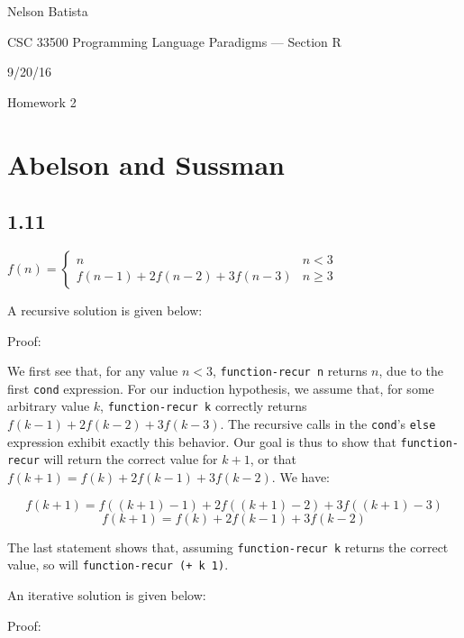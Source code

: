 \documentclass{article}
\begin{document}
Nelson Batista

CSC 33500 Programming Language Paradigms --- Section R

9/20/16

Homework 2

\section*{Abelson and Sussman}

\subsection*{1.11}

\vspace{\baselineskip}

$ f(n) = \begin{cases}
  n & n < 3 \\
  f(n-1) + 2f(n-2) + 3f(n-3) & n \geq 3
\end{cases}
$

\vspace{\baselineskip}

A recursive solution is given below:

\lstset{basicstyle=\ttfamily}


Proof:

We first see that, for any value $n < 3$, \texttt{function-recur n} returns $n$, due to the first \texttt{cond} expression. For our induction hypothesis, we assume that, for some arbitrary value $k$, \texttt{function-recur k} correctly returns $f(k-1) + 2f(k-2) + 3f(k-3)$. The recursive calls in the \texttt{cond}'s \texttt{else} expression exhibit exactly this behavior. Our goal is thus to show that \texttt{function-recur} will return the correct value for $k+1$, or that $f(k+1) = f(k) + 2f(k-1) + 3f(k-2)$. We have:

\[ f(k+1) = f((k+1)-1) + 2f((k+1)-2) + 3f((k+1)-3) \]
\[ f(k+1) = f(k) + 2f(k-1) + 3f(k-2) \]

The last statement shows that, assuming \texttt{function-recur k} returns the correct value, so will \texttt{function-recur (+ k 1)}.

An iterative solution is given below:



Proof: 
\end{document}
